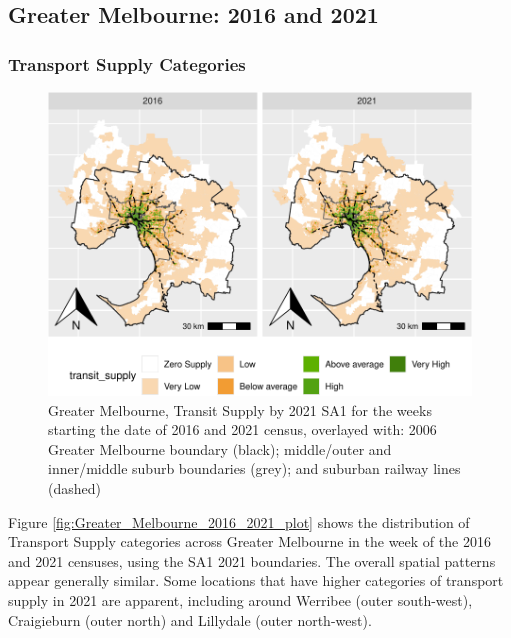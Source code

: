 \documentclass[preprint, 3p,
authoryear]{elsarticle} %
\begin{document}
\subsection{Greater Melbourne: 2016 and
2021}\label{greater-melbourne-2016-and-2021}

\subsubsection{Transport Supply
Categories}\label{transport-supply-categories-1}

\begin{figure}
\centering
\includegraphics{Leveraging_GTFS_to_assess_transit_supply_Transport_Geography_files/figure-latex/Greater_Melbourne_2016_2021_plot-1.pdf}
\caption{Greater Melbourne, Transit Supply by 2021 SA1 for the weeks
starting the date of 2016 and 2021 census, overlayed with: 2006 Greater
Melbourne boundary (black); middle/outer and inner/middle suburb
boundaries (grey); and suburban railway lines (dashed)}
\end{figure}

Figure \ref{fig:Greater_Melbourne_2016_2021_plot} shows the distribution
of Transport Supply categories across Greater Melbourne in the week of
the 2016 and 2021 censuses, using the SA1 2021 boundaries. The overall
spatial patterns appear generally similar. Some locations that have
higher categories of transport supply in 2021 are apparent, including
around Werribee (outer south-west), Craigieburn (outer north) and
Lillydale (outer north-west).
\end{document}
